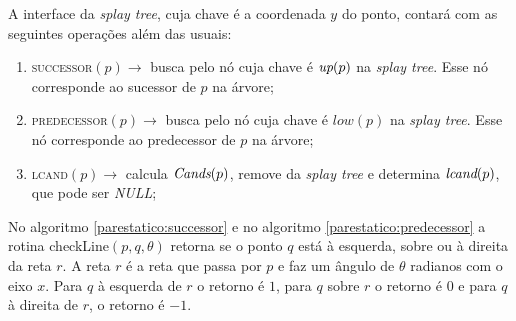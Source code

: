 A interface da \textit{splay tree}, cuja chave é a
coordenada $y$ do ponto, contará com as seguintes operações além
das usuais:
\begin{enumerate}
    \item \textsc{successor}$(p) \rightarrow$ busca pelo nó
    cuja chave é $\textit{up}(p)$ na \textit{splay tree}.
    Esse nó corresponde ao sucessor de $p$ na árvore;
    \item \textsc{predecessor}$(p) \rightarrow$ busca pelo nó cuja chave é $low(p)$ na \textit{splay tree}. Esse nó corresponde ao predecessor de $p$ na árvore;
    \item \textsc{lcand}$(p) \rightarrow$ calcula $\textit{Cands}(p)$, remove da
    \textit{splay tree} e determina $\textit{lcand}(p)$, que pode ser \textit{NULL};
\end{enumerate}


No algoritmo \ref{parestatico:successor} e no algoritmo
\ref{parestatico:predecessor} a rotina checkLine$(p, q, \theta)$ retorna se o ponto
$q$ está à esquerda, sobre ou à direita da reta $r$. A reta $r$ é a reta que
passa por $p$ e faz um ângulo de $\theta$ radianos com o eixo $x$. Para $q$
à esquerda de $r$ o retorno é $1$, para $q$ sobre $r$ o retorno é $0$ e para
$q$ à direita de $r$, o retorno é $-1$.


